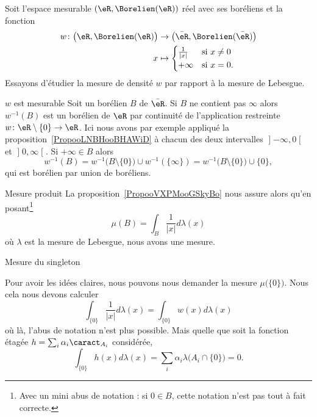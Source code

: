 \begin{example}      \label{EXooKQDRooVMWaEC}
    Soit l'espace mesurable \( (\eR,\Borelien(\eR))\) réel avec ses boréliens et la fonction
    \begin{equation}
        \begin{aligned}
            w\colon \big( \eR,\Borelien(\eR) \big)&\to\big( \bar \eR,\Borelien(\bar \eR) \big) \\
            x&\mapsto \begin{cases}
                \frac{1}{ | x | }    &   \text{si } x\neq 0\\
                +\infty    &    \text{si }x=0.
            \end{cases}
        \end{aligned}
    \end{equation}
    Essayons d'étudier la mesure de densité \( w\) par rapport à la mesure de Lebesgue.
    \begin{subproof}
    \item[\( w\) est mesurable]
    Soit un borélien \( B\) de \( \bar \eR\). Si \( B\) ne contient pas \( \infty\) alors \( w^{-1}(B)\) est un borélien de \( \eR\) par continuité de l'application restreinte \( w\colon \eR\setminus\{ 0 \}\to \eR \). Ici nous avons par exemple appliqué la proposition~\ref{PropooLNBHooBHAWiD} à chacun des deux intervalles \( \mathopen] -\infty , 0 \mathclose[\) et \( \mathopen] 0 , \infty \mathclose[\). Si \( +\infty\in B\) alors
        \begin{equation}
            w^{-1}(B)=w^{-1}\big( B\setminus\{ 0 \} \big)\cup w^{-1}(\{ \infty \})=  w^{-1}\big( B\setminus\{ 0 \} \big)\cup \{ 0 \},
        \end{equation}
        qui est borélien par union de boréliens.
    \item[Mesure produit]
    La proposition~\ref{PropooVXPMooGSkyBo} nous assure alors qu'en posant\footnote{Avec un mini abus de notation : si \( 0\in B\), cette notation n'est pas tout à fait correcte.}
    \begin{equation}
        \mu(B)=\int_B\frac{1}{ | x | }d\lambda(x)
    \end{equation}
    où \(  \lambda \) est la mesure de Lebesgue, nous avons une mesure.

\item[Mesure du singleton]

    Pour avoir les idées claires, nous pouvons nous demander la mesure \( \mu\big( \{ 0 \} \big)\). Nous cela nous devons calculer
    \begin{equation}
        \int_{\{ 0 \}}\frac{1}{ | x | }d\lambda(x)=\int_{\{ 0 \}}w(x)d\lambda(x)
    \end{equation}
    où là, l'abus de notation n'est plus possible. Mais quelle que soit la fonction étagée \( h=\sum_i\alpha_i\caract_{A_i}\) considérée,
    \begin{equation}
        \int_{\{ 0 \}}h(x)d\lambda(x)=\sum_i\alpha_i\lambda\big( A_i\cap\{ 0 \} \big)=0.
    \end{equation}


\end{subproof}
\end{example}
